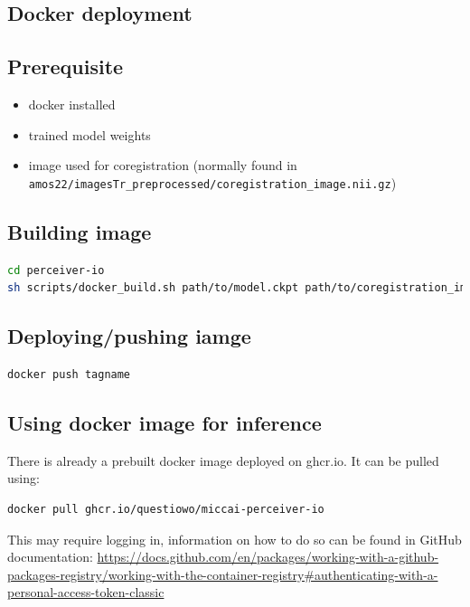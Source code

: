 \documentclass{l4proj}
\begin{document}
\begin{appendices}
\section{Docker deployment}

\subsection{Prerequisite}

\begin{itemize}
  \item{docker installed}
  \item{trained model weights}
  \item{image used for coregistration (normally found in \\ \lstinline{amos22/imagesTr_preprocessed/coregistration_image.nii.gz})}
\end{itemize}

\subsection{Building image}

\begin{lstlisting}[language=bash]
cd perceiver-io
sh scripts/docker_build.sh path/to/model.ckpt path/to/coregistration_image.nii.gz tagname
\end{lstlisting}

\subsection{Deploying/pushing iamge}

\begin{lstlisting}[language=bash]
docker push tagname
\end{lstlisting}

\subsection{Using docker image for inference}

There is already a prebuilt docker image deployed on ghcr.io. It can be pulled using:

\begin{lstlisting}[language=bash]
docker pull ghcr.io/questiowo/miccai-perceiver-io
\end{lstlisting}

This may require logging in, information on how to do so can be found in GitHub documentation: \url{https://docs.github.com/en/packages/working-with-a-github-packages-registry/working-with-the-container-registry#authenticating-with-a-personal-access-token-classic}


\end{appendices}
\end{document}
